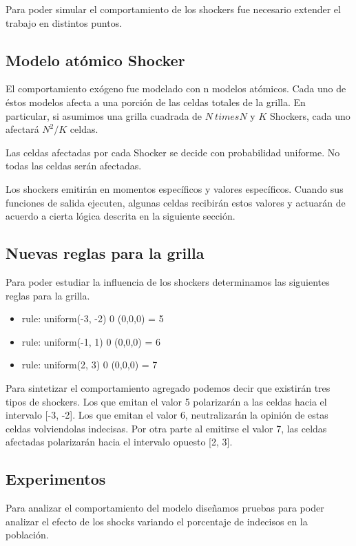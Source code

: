 Para poder simular el comportamiento de los shockers fue necesario extender el trabajo en distintos puntos.

\subsection{Modelo atómico Shocker}

El comportamiento exógeno fue modelado con n modelos atómicos. Cada uno de éstos modelos afecta a una porción de las celdas totales de la grilla.
En particular, si asumimos una grilla cuadrada de $N\ times N$ y $K$ Shockers, cada uno afectará $N^2/K$ celdas.

Las celdas afectadas por cada Shocker se decide con probabilidad uniforme. No todas las celdas serán afectadas.

Los shockers emitirán en momentos específicos y valores específicos. Cuando sus funciones de salida ejecuten, algunas celdas recibirán estos valores y actuarán de acuerdo a cierta lógica descrita en la siguiente sección.


\subsection{Nuevas reglas para la grilla}

Para poder estudiar la influencia de los shockers determinamos las siguientes reglas para la grilla.

\begin{itemize}
    \item rule: {  uniform(-3, -2) } 0 { (0,0,0) = 5 }
    \item rule: {  uniform(-1, 1)  } 0 { (0,0,0) = 6 }
    \item rule: {  uniform(2, 3) } 0 { (0,0,0) = 7 } 
\end{itemize}

Para sintetizar el comportamiento agregado podemos decir que existirán tres tipos de shockers. Los que emitan el valor 5 polarizarán a las celdas hacia el intervalo [-3, -2]. Los que emitan el valor 6, neutralizarán la opinión de estas celdas volviendolas indecisas. Por otra parte al emitirse el valor 7, las celdas afectadas polarizarán hacia el intervalo opuesto [2, 3].


\subsection{Experimentos}

Para analizar el comportamiento del modelo diseñamos pruebas para poder analizar el efecto de los shocks variando el porcentaje de indecisos en la población.

